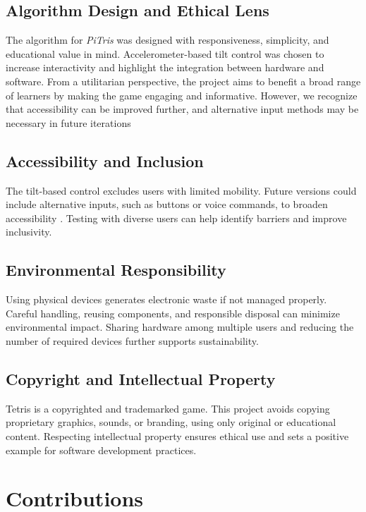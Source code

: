 \documentclass[12pt]{report}
\begin{document}
\section{Algorithm Design and Ethical Lens}
The algorithm for \textit{PiTris} was designed with responsiveness, simplicity, and educational value in mind. Accelerometer-based tilt control was chosen to increase interactivity and highlight the integration between hardware and software. From a utilitarian perspective, the project aims to benefit a broad range of learners by making the game engaging and informative. However, we recognize that accessibility can be improved further, and alternative input methods may be necessary in future iterations

\section{Accessibility and Inclusion}
The tilt-based control excludes users with limited mobility. Future versions could include alternative inputs, such as buttons or voice commands, to broaden accessibility \cite{Seale2014}. Testing with diverse users can help identify barriers and improve inclusivity.



\section{Environmental Responsibility}
Using physical devices generates electronic waste if not managed properly. Careful handling, reusing components, and responsible disposal can minimize environmental impact. Sharing hardware among multiple users and reducing the number of required devices further supports sustainability.

\section{Copyright and Intellectual Property}
Tetris is a copyrighted and trademarked game. This project avoids copying proprietary graphics, sounds, or branding, using only original or educational content. Respecting intellectual property ensures ethical use and sets a positive example for software development practices.




\chapter{Contributions}
\end{document}
